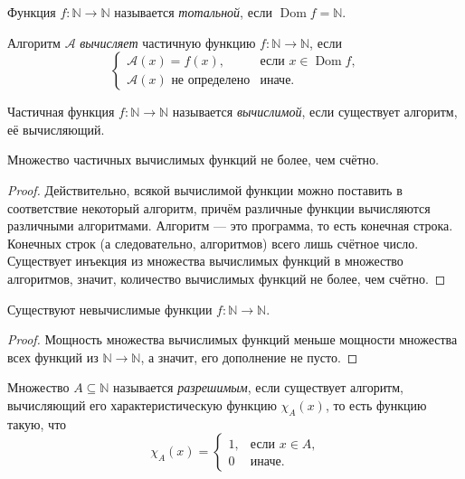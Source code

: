 \documentclass{article}
\begin{document}
    \begin{definition}
        Функция $f: \mathbb{N} \to \mathbb{N}$ называется \textit{тотальной}, если $\operatorname{Dom} f = \mathbb{N}.$
    \end{definition}

    \begin{definition}
        Алгоритм $\mathcal{A}$ \textit{вычисляет} частичную функцию $f: \mathbb{N} \to \mathbb{N}$, если
        $$
            \begin{cases}
                \mathcal{A}(x) = f(x), & \text{если $x \in \operatorname{Dom} f$,}\\
                \mathcal{A}(x) \text{ не определено} & \text{иначе.}
            \end{cases}
        $$
    \end{definition}

    \begin{definition}
        Частичная функция $f: \mathbb{N} \to \mathbb{N}$ называется \textit{вычислимой}, если существует
        алгоритм, её вычисляющий.
    \end{definition}

    \begin{statement}
        Множество частичных вычислимых функций не более, чем счётно.
    \end{statement}
    \begin{proof}
        Действительно, всякой вычислимой функции можно поставить в соответствие некоторый алгоритм,
        причём различные функции вычисляются различными алгоритмами. Алгоритм --- это программа,
        то есть конечная строка. Конечных строк (а следовательно, алгоритмов) всего лишь счётное число.
        Существует инъекция из множества вычислимых функций в множество алгоритмов, значит, количество
        вычислимых функций не более, чем счётно.
    \end{proof}

    \begin{theorem}
        Существуют невычислимые функции $f: \mathbb{N} \to \mathbb{N}$.
    \end{theorem}
    \begin{proof}
        Мощность множества вычислимых функций меньше мощности множества всех функций из $\mathbb{N}
        \to \mathbb{N}$, а значит, его дополнение не пусто.
    \end{proof}

    \begin{definition}
        Множество $A \subseteq \mathbb{N}$ называется \textit{разрешимым}, если существует алгоритм, вычисляющий
        его характеристическую функцию $\chi_A(x)$, то есть функцию такую, что
        $$
            \chi_A(x) =
            \begin{cases}
                1, & \text{если $x \in A$,}\\
                0 & \text{иначе.}
            \end{cases}
        $$
    \end{definition}
\end{document}
